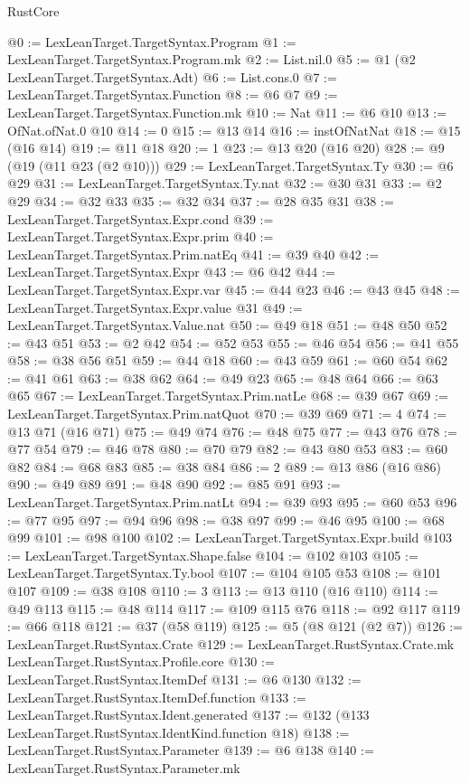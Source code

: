 \begin{lexlean}{RustCore}
\begin{coremodule}
@0 := LexLeanTarget.TargetSyntax.Program
@1 := LexLeanTarget.TargetSyntax.Program.mk
@2 := List.nil.{0}
@5 := @1 (@2 LexLeanTarget.TargetSyntax.Adt)
@6 := List.cons.{0}
@7 := LexLeanTarget.TargetSyntax.Function
@8 := @6 @7
@9 := LexLeanTarget.TargetSyntax.Function.mk
@10 := Nat
@11 := @6 @10
@13 := OfNat.ofNat.{0} @10
@14 := 0
@15 := @13 @14
@16 := instOfNatNat
@18 := @15 (@16 @14)
@19 := @11 @18
@20 := 1
@23 := @13 @20 (@16 @20)
@28 := @9 (@19 (@11 @23 (@2 @10)))
@29 := LexLeanTarget.TargetSyntax.Ty
@30 := @6 @29
@31 := LexLeanTarget.TargetSyntax.Ty.nat
@32 := @30 @31
@33 := @2 @29
@34 := @32 @33
@35 := @32 @34
@37 := @28 @35 @31
@38 := LexLeanTarget.TargetSyntax.Expr.cond
@39 := LexLeanTarget.TargetSyntax.Expr.prim
@40 := LexLeanTarget.TargetSyntax.Prim.natEq
@41 := @39 @40
@42 := LexLeanTarget.TargetSyntax.Expr
@43 := @6 @42
@44 := LexLeanTarget.TargetSyntax.Expr.var
@45 := @44 @23
@46 := @43 @45
@48 := LexLeanTarget.TargetSyntax.Expr.value @31
@49 := LexLeanTarget.TargetSyntax.Value.nat
@50 := @49 @18
@51 := @48 @50
@52 := @43 @51
@53 := @2 @42
@54 := @52 @53
@55 := @46 @54
@56 := @41 @55
@58 := @38 @56 @51
@59 := @44 @18
@60 := @43 @59
@61 := @60 @54
@62 := @41 @61
@63 := @38 @62
@64 := @49 @23
@65 := @48 @64
@66 := @63 @65
@67 := LexLeanTarget.TargetSyntax.Prim.natLe
@68 := @39 @67
@69 := LexLeanTarget.TargetSyntax.Prim.natQuot
@70 := @39 @69
@71 := 4
@74 := @13 @71 (@16 @71)
@75 := @49 @74
@76 := @48 @75
@77 := @43 @76
@78 := @77 @54
@79 := @46 @78
@80 := @70 @79
@82 := @43 @80 @53
@83 := @60 @82
@84 := @68 @83
@85 := @38 @84
@86 := 2
@89 := @13 @86 (@16 @86)
@90 := @49 @89
@91 := @48 @90
@92 := @85 @91
@93 := LexLeanTarget.TargetSyntax.Prim.natLt
@94 := @39 @93
@95 := @60 @53
@96 := @77 @95
@97 := @94 @96
@98 := @38 @97
@99 := @46 @95
@100 := @68 @99
@101 := @98 @100
@102 := LexLeanTarget.TargetSyntax.Expr.build
@103 := LexLeanTarget.TargetSyntax.Shape.false
@104 := @102 @103
@105 := LexLeanTarget.TargetSyntax.Ty.bool
@107 := @104 @105 @53
@108 := @101 @107
@109 := @38 @108
@110 := 3
@113 := @13 @110 (@16 @110)
@114 := @49 @113
@115 := @48 @114
@117 := @109 @115 @76
@118 := @92 @117
@119 := @66 @118
@121 := @37 (@58 @119)
@125 := @5 (@8 @121 (@2 @7))
@126 := LexLeanTarget.RustSyntax.Crate
@129 := LexLeanTarget.RustSyntax.Crate.mk LexLeanTarget.RustSyntax.Profile.core
@130 := LexLeanTarget.RustSyntax.ItemDef
@131 := @6 @130
@132 := LexLeanTarget.RustSyntax.ItemDef.function
@133 := LexLeanTarget.RustSyntax.Ident.generated
@137 := @132 (@133 LexLeanTarget.RustSyntax.IdentKind.function @18)
@138 := LexLeanTarget.RustSyntax.Parameter
@139 := @6 @138
@140 := LexLeanTarget.RustSyntax.Parameter.mk

\end{coremodule}
\end{lexlean}
